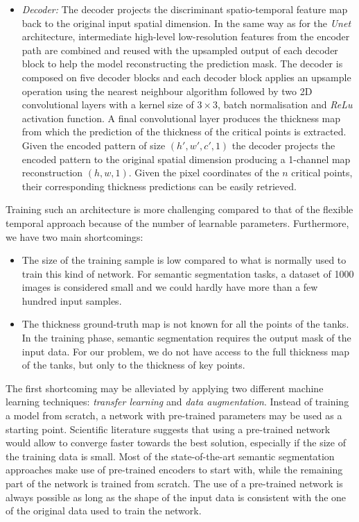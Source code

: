\begin{itemize}
    \item \textit{Decoder:} The decoder projects the discriminant spatio-temporal feature map back to the original input spatial dimension. In the same way as for the \textit{Unet} architecture, intermediate high-level low-resolution features from the encoder path are combined and reused with the upsampled output of each decoder block to help the model reconstructing the prediction mask. The decoder is composed on five decoder blocks and each decoder block applies an upsample operation using the nearest neighbour algorithm followed by two 2D convolutional layers with a kernel size of $3\times 3$, batch normalisation and \textit{ReLu} activation function. A final convolutional layer produces the thickness map from which the prediction of the thickness of the critical  points is extracted. Given the encoded pattern of size $(h', w', c', 1)$ the decoder projects the encoded pattern to the original spatial dimension producing a 1-channel map reconstruction $(h, w, 1)$. Given the pixel coordinates of the $n$ critical points, their corresponding thickness predictions can be easily retrieved.
\end{itemize}

Training such an architecture is more challenging compared to that of the flexible temporal approach because of the number of learnable parameters. Furthermore, we have two main shortcomings:

\begin{itemize}
    \item The size of the training sample is low compared to what is normally used to train this kind of network. For semantic segmentation tasks, a dataset of 1000 images is considered small and we could hardly have more than a few hundred input samples.
    \item The thickness ground-truth map is not known for all the points of the tanks. In the training phase, semantic segmentation requires the output mask of the input data. For our problem, we do not have access to the full thickness map of the tanks, but only to the thickness of key points.
\end{itemize}

The first shortcoming may be alleviated by applying two different machine learning techniques: \textit{transfer learning} and \textit{data augmentation}. Instead of training a model from scratch, a network with pre-trained parameters may be used as a starting point. Scientific literature suggests that using a pre-trained network would allow to converge faster towards the best solution, especially if the size of the training data is small. Most of the state-of-the-art semantic segmentation approaches make use of pre-trained encoders to start with, while the remaining part of the network is trained from scratch. The use of a pre-trained network is always possible as long as the shape of the input data is consistent with the one of the original data used to train the network. 

